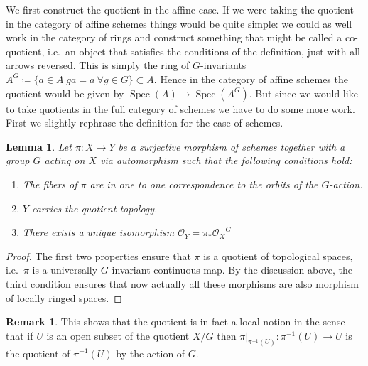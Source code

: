 \documentclass[11pt, a4paper, german, twoside]{article}
\theoremstyle{plain}
\newtheorem{lemma}[theorem]{Lemma}
\theoremstyle{definition}
\newtheorem{remark}[theorem]{Remark}
\DeclareMathOperator{\Spec}{Spec}
\begin{document}
We first construct the quotient in the affine case. If we were taking the quotient in the category of affine schemes things would be
quite simple: we could as well work in the category of rings and construct something that might be called a co-quotient, i.e.\ an object that
satisfies the conditions of the definition, just with all arrows reversed. This is simply the ring of $G$-invariants
$A^G \coloneqq \{a \in A | ga = a \ \forall g \in G\} \subset A$. Hence in the category of affine schemes the quotient would be given by 
$\Spec(A) \to \Spec(A^G)$. But since we would like to take quotients in the full category of schemes we have to do some more work.
First we slightly rephrase the definition for the case of schemes.
\begin{lemma}
    \label{quotProps}
    Let $\pi \colon X \to Y$ be a surjective morphism of schemes together with a group $G$ acting on $X$ via automorphism 
    such that the following conditions hold:
    \begin{enumerate}[label=\rm{\roman*)}]
        \item The fibers of $\pi$ are in one to one correspondence to the orbits of the $G$-action.
        \item $Y$ carries the quotient topology.
        \item There exists a unique isomorphism $\mathcal{O}_Y = {\pi_*\mathcal{O}_X}^G$
    \end{enumerate}
\end{lemma}
\begin{proof}
    The first two properties ensure that $\pi$ is a quotient of topological spaces, i.e.\ $\pi$ is a universally $G$-invariant continuous map.
    By the discussion above, the third condition ensures that now actually all these morphisms are also morphism of locally ringed spaces.
\end{proof}

\begin{remark}
    \label{quotLocal}
    This shows that the quotient is in fact a local notion in the sense that if $U$ is an open subset of the quotient $X/G$ 
    then $\pi|_{\pi^{-1}(U)} \colon \pi^{-1}(U) \to U$ is the quotient of $\pi^{-1}(U)$ by the action of $G$.
\end{remark}
\end{document}
